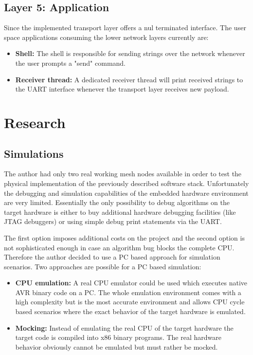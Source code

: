\section{Layer 5: Application}%

Since the implemented transport layer offers a nul terminated interface. The user space applications consuming the lower network layers currently are:

\begin{itemize}
    \item \textbf{Shell:} The shell is responsible for sending strings over the network whenever the user prompts a "send" command.
    \item \textbf{Receiver thread:} A dedicated receiver thread will print received strings to the UART interface whenever the transport layer receives new payload.
\end{itemize}

\chapter{Research}%
\section{Simulations}%
The author had only two real working mesh nodes available in order to test the physical implementation of the previously described software stack. Unfortunately the debugging and simulation capabilities of the embedded hardware environment are very limited. Essentially the only possibility to debug algorithms on the target hardware is either to buy additional hardware debugging facilities (like JTAG debuggers) or using simple debug print statements via the UART.

The first option imposes additional costs on the project and the second option is not sophisticated enough in case an algorithm bug blocks the complete CPU. Therefore the author decided to use a PC based approach for simulation scenarios. Two approaches are possible for a PC based simulation:

\begin{itemize}
    \item \textbf{CPU emulation:} A real CPU emulator could be used which executes native AVR binary code on a PC. The whole emulation environment comes with a high complexity but is the most accurate environment and allows CPU cycle based scenarios where the exact behavior of the target hardware is emulated.
    \item \textbf{Mocking:} Instead of emulating the real CPU of the target hardware the target code is compiled into x86 binary programs. The real hardware behavior obviously cannot be emulated but must rather be mocked.
\end{itemize}

